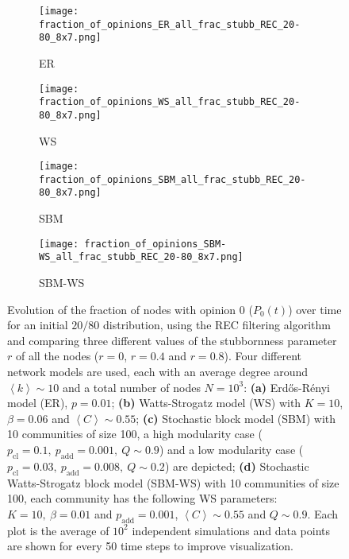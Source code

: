 \documentclass[11 pt , letterpaper , twoside , openright]{book}
\begin{document}
\newpage
\begin{figure}[H]
  \begin{subfigure}[b]{0.49\textwidth}
  	\texttt{[image: fraction\_of\_opinions\_ER\_all\_frac\_stubb\_REC\_20-80\_8x7.png]}
    \caption{ER}
  \end{subfigure}
  \begin{subfigure}[b]{0.49\textwidth}
  	\texttt{[image: fraction\_of\_opinions\_WS\_all\_frac\_stubb\_REC\_20-80\_8x7.png]}
    \caption{WS}
  \end{subfigure}
  \begin{subfigure}[b]{0.49\textwidth}
    \texttt{[image: fraction\_of\_opinions\_SBM\_all\_frac\_stubb\_REC\_20-80\_8x7.png]}
    \caption{SBM}
  \end{subfigure}
  \begin{subfigure}[b]{0.49\textwidth}
    \texttt{[image: fraction\_of\_opinions\_SBM-WS\_all\_frac\_stubb\_REC\_20-80\_8x7.png]}
    \caption{SBM-WS}
  \end{subfigure}
  \captionsetup{format=plain}
  \caption[Evolution of the fraction of nodes with opinion 0 ($P_0(t)$) over time for an initial $20/80$ opinion distribution, using the REC filtering algorithm and comparing three different values of the stubbornness parameter $r$ of all the nodes ($r = 0$, $r = 0.4$ and $r = 0.8$).]{Evolution of the fraction of nodes with opinion 0 ($P_0(t)$) over time for an initial $20/80$ distribution, using the REC filtering algorithm and comparing three different values of the stubbornness parameter $r$ of all the nodes ($r = 0$, $r = 0.4$ and $r = 0.8$). Four different network models are used, each with an average degree around $\left<k\right> \sim 10$ and a total number of nodes $N = 10^3$: \textbf{(a)} Erd\H{o}s-R\'{e}nyi model (ER), $p=0.01$; \textbf{(b)} Watts-Strogatz model (WS) with $K = 10$, $\beta = 0.06$ and $\left<C\right> \sim 0.55$; \textbf{(c)} Stochastic block model (SBM) with 10 communities of size 100, a high modularity case ($p_{\text{cl}} = 0.1,\ p_{\text{add}} = 0.001,\ Q \sim 0.9$) and a low modularity case ($p_{\text{cl}} = 0.03,\ p_{\text{add}} = 0.008,\ Q \sim 0.2$) are depicted; \textbf{(d)} Stochastic Watts-Strogatz block model (SBM-WS) with 10 communities of size 100, each community has the following WS parameters: $K = 10,\ \beta = 0.01$ and $p_{\text{add}} = 0.001$, $\left<C\right> \sim 0.55$ and $Q \sim 0.9$. Each plot is the average of $10^2$ independent simulations and data points are shown for every 50 time steps to improve visualization.}%
\label{ev_op_20_80_all_frac_stubb_REC}
\end{figure}
\end{document}
